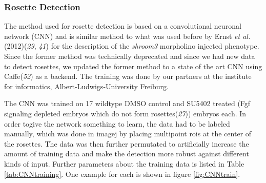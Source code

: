 \documentclass[11pt,singlespacinge,twoside]{reedthesis} %
\begin{document}
\hypertarget{CNN}{%
\subsubsection{Rosette Detection}\label{CNN}}

The method used for rosette detection is based on a convolutional neuronal network (CNN) and is similar method to what was used before by Ernst \emph{et al.}(2012)(\emph{29}, \emph{41}) for the description of the \emph{shroom3} morpholino injected phenotype. Since the former method was technically deprecated and since we had new data to detect rosettes, we updated the former method to a state of the art CNN using Caffe(\emph{52}) as a backend. The training was done by our partners at the institute for informatics, Albert-Ludwigs-University Freiburg.

The CNN was trained on 17 wildtype DMSO control and SU5402 treated (Fgf signaling depleted embryos which do not form rosettes(\emph{27})) embryos each. In order togive the network something to learn, the data had to be labeled manually, which was done in imagej by placing multipoint rois at the center of the rosettes. The data was then further permutated to artificially increase the amount of training data and make the detection more robust against different kinds of input. Further parameters about the training data is listed in Table \ref{tab:CNNtraining}. One example for each is shown in figure \ref{fig:CNNtrain}.
\end{document}
